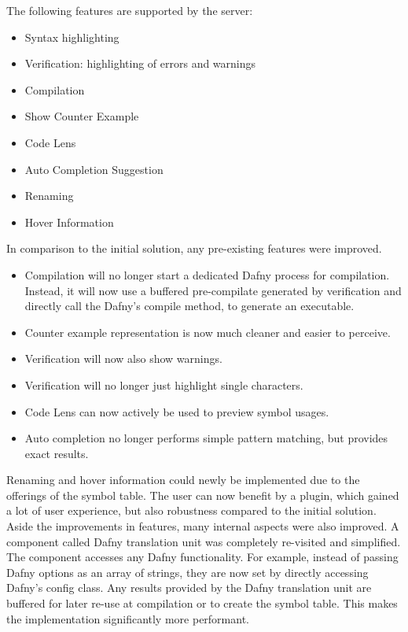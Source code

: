 The following features are supported by the server:
\begin{itemize}
    \item Syntax highlighting
    \item Verification: highlighting of errors and warnings
    \item Compilation
    \item Show Counter Example
    \item Code Lens
    \item Auto Completion Suggestion
    \item Renaming
    \item Hover Information
\end{itemize}

In comparison to the initial solution, any pre-existing features were improved.

\begin{itemize}
 \item Compilation will no longer start a dedicated Dafny process for compilation. Instead, it will now use a buffered pre-compilate generated by verification and directly call the Dafny's compile method, to generate an executable.
 \item Counter example representation is now much cleaner and easier to perceive.
 \item Verification will now also show warnings.
 \item Verification will no longer just highlight single characters.
 \item Code Lens can now actively be used to preview symbol usages.
 \item Auto completion no longer performs simple pattern matching, but provides exact results.
\end{itemize}
Renaming and hover information could newly be implemented due to the offerings of the symbol table.
The user can now benefit by a plugin, which gained a lot of user experience, but also robustness compared to the initial solution.\\

Aside the improvements in features, many internal aspects were also improved.
A component called Dafny translation unit was completely re-visited and simplified.
The component accesses any Dafny functionality.
For example, instead of passing Dafny options as an array of strings, they are now set by
directly accessing Dafny's config class.
Any results provided by the Dafny translation unit are buffered for later re-use at compilation or to create the symbol table.
This makes the implementation significantly more performant.\\

